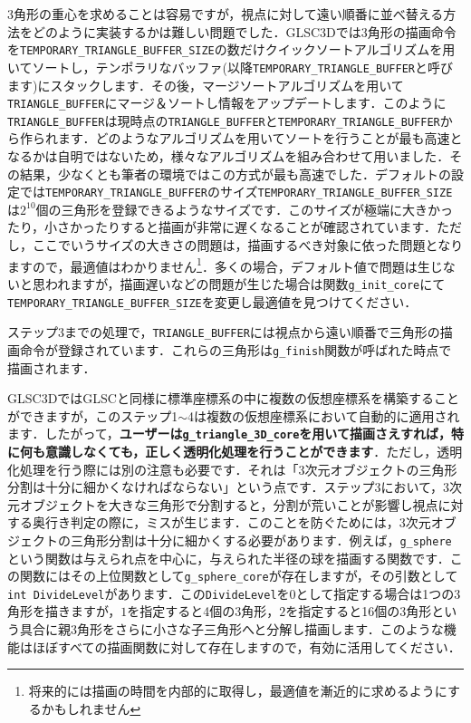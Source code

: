 \documentclass[platex,a4paper,12pt]{jsarticle}%
\begin{document}

3角形の重心を求めることは容易ですが，視点に対して遠い順番に並べ替える方法をどのように実装するかは難しい問題でした．GLSC3Dでは3角形の描画命令を\verb|TEMPORARY_TRIANGLE_BUFFER_SIZE|の数だけクイックソートアルゴリズムを用いてソートし，テンポラリなバッファ(以降\verb|TEMPORARY_TRIANGLE_BUFFER|と呼びます)にスタックします．その後，マージソートアルゴリズムを用いて\verb|TRIANGLE_BUFFER|にマージ＆ソートし情報をアップデートします．このように\verb|TRIANGLE_BUFFER|は現時点の\verb|TRIANGLE_BUFFER|と\verb|TEMPORARY_TRIANGLE_BUFFER|から作られます．どのようなアルゴリズムを用いてソートを行うことが最も高速となるかは自明ではないため，様々なアルゴリズムを組み合わせて用いました．その結果，少なくとも筆者の環境ではこの方式が最も高速でした．デフォルトの設定では\verb|TEMPORARY_TRIANGLE_BUFFER|のサイズ\verb|TEMPORARY_TRIANGLE_BUFFER_SIZE|は$2^{10}$個の三角形を登録できるようなサイズです．このサイズが極端に大きかったり，小さかったりすると描画が非常に遅くなることが確認されています．ただし，ここでいうサイズの大きさの問題は，描画するべき対象に依った問題となりますので，最適値はわかりません\footnote{将来的には描画の時間を内部的に取得し，最適値を漸近的に求めるようにするかもしれません}．多くの場合，デフォルト値で問題は生じないと思われますが，描画遅いなどの問題が生じた場合は関数\verb|g_init_core|にて\verb|TEMPORARY_TRIANGLE_BUFFER_SIZE|を変更し最適値を見つけてください．


ステップ3までの処理で，\verb|TRIANGLE_BUFFER|には視点から遠い順番で三角形の描画命令が登録されています．これらの三角形は\verb|g_finish|関数が呼ばれた時点で描画されます．

\vspace{10mm}
GLSC3DではGLSCと同様に標準座標系の中に複数の仮想座標系を構築することができますが，このステップ1$\sim$4は複数の仮想座標系において自動的に適用されます．したがって，{\bf ユーザーは\verb|g_triangle_3D_core|を用いて描画さえすれば，特に何も意識しなくても，正しく透明化処理を行うことができます}．ただし，透明化処理を行う際には別の注意も必要です．それは「3次元オブジェクトの三角形分割は十分に細かくなければならない」という点です．ステップ3において，3次元オブジェクトを大きな三角形で分割すると，分割が荒いことが影響し視点に対する奥行き判定の際に，ミスが生じます．このことを防ぐためには，3次元オブジェクトの三角形分割は十分に細かくする必要があります．例えば，\verb|g_sphere|という関数は与えられ点を中心に，与えられた半径の球を描画する関数です．この関数にはその上位関数として\verb|g_sphere_core|が存在しますが，その引数として\verb|int DivideLevel|があります．この\verb|DivideLevel|を$0$として指定する場合は1つの3角形を描きますが，$1$を指定すると4個の3角形，$2$を指定すると16個の3角形という具合に親3角形をさらに小さな子三角形へと分解し描画します．このような機能はほぼすべての描画関数に対して存在しますので，有効に活用してください．
\end{document}
